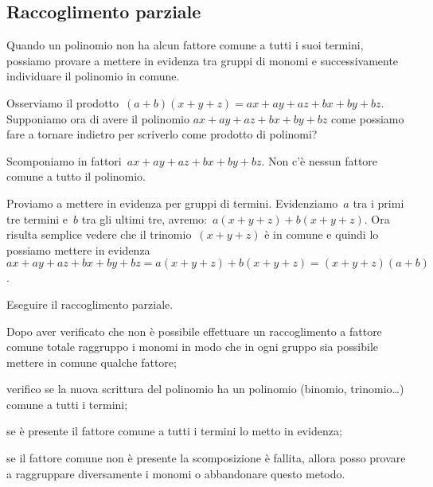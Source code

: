 % 

\subsection{Raccoglimento parziale}
\label{subsec:divpol_raccoglimentoparziale}

Quando un polinomio non ha alcun fattore comune a tutti i suoi termini, 
possiamo provare a mettere in evidenza tra gruppi di monomi
e successivamente individuare il polinomio in comune.

Osserviamo il prodotto~$(a+b)(x+y+z)=ax+ay+az+bx+by+bz$. Supponiamo ora di 
avere il polinomio $ax+ay+az+bx+by+bz$ come possiamo fare a tornare indietro 
per scriverlo come prodotto di polinomi?

\begin{exrig}
 \begin{esempio}
Scomponiamo in fattori~$ax+ay+az+bx+by+bz$. Non c'è nessun fattore comune a 
tutto il polinomio.

Proviamo a mettere in evidenza per gruppi di termini. Evidenziamo~$a$ tra i 
primi tre termini e~$b$ tra gli ultimi tre, 
avremo:~$a(x+y+z)+b(x+y+z)$. Ora risulta semplice vedere che il 
trinomio~$(x+y+z)$ è in comune e quindi lo possiamo mettere 
in evidenza~$ax+ay+az+bx+by+bz=a(x+y+z)+b(x+y+z)=(x+y+z)(a+b)$.
 \end{esempio}
\end{exrig}

\begin{procedura}
Eseguire il raccoglimento parziale.
\begin{enumeratea}
\item Dopo aver verificato che non è possibile effettuare un raccoglimento a 
 fattore comune totale raggruppo i monomi in modo che in ogni gruppo sia 
 possibile mettere in comune qualche fattore;
\item verifico se la nuova scrittura del polinomio ha un polinomio 
 (binomio, trinomio\ldots) comune a tutti i termini;
\item se è presente il fattore comune a tutti i termini lo metto in evidenza;
\item se il fattore comune non è presente la scomposizione è fallita, allora 
 posso provare a raggruppare diversamente i monomi o abbandonare questo metodo.
\end{enumeratea}
\end{procedura}

